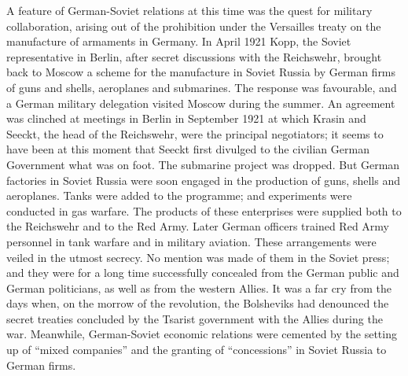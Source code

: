 A feature of German-Soviet relations at this time was the quest for military collaboration, arising out of the prohibition under the Versailles treaty on the manufacture of armaments in Germany. In April 1921 Kopp, the Soviet representative in Berlin, after secret discussions with the Reichswehr, brought back to Moscow a scheme for the manufacture in Soviet Russia by German firms of guns and shells, aeroplanes and submarines. The response was favourable, and a German military delegation visited Moscow during the summer. An agreement was clinched at meetings in Berlin in September 1921 at which Krasin and Seeckt, the head of the Reichswehr, were the principal negotiators; it seems to have been at this moment that Seeckt first divulged to the civilian German Government what was on foot. The submarine project was dropped. But German factories in Soviet Russia were soon engaged in the production of guns, shells and aeroplanes. Tanks were added to the programme; and experiments were conducted in gas warfare. The products of these enterprises were supplied both to the Reichswehr and to the Red Army. Later German officers trained Red Army personnel in tank warfare and in military aviation. These arrangements were veiled in the utmost secrecy. No mention was made of them in the Soviet press; and they were for a long time successfully concealed from the German public and German politicians, as well as from the western Allies. It was a far cry from the days when, on the morrow of the revolution, the Bolsheviks had denounced the secret treaties concluded by the Tsarist government with the Allies during the war. Meanwhile, German-Soviet economic relations were cemented by the setting up of ``mixed companies'' and the granting of ``concessions'' in Soviet Russia to German firms. 

